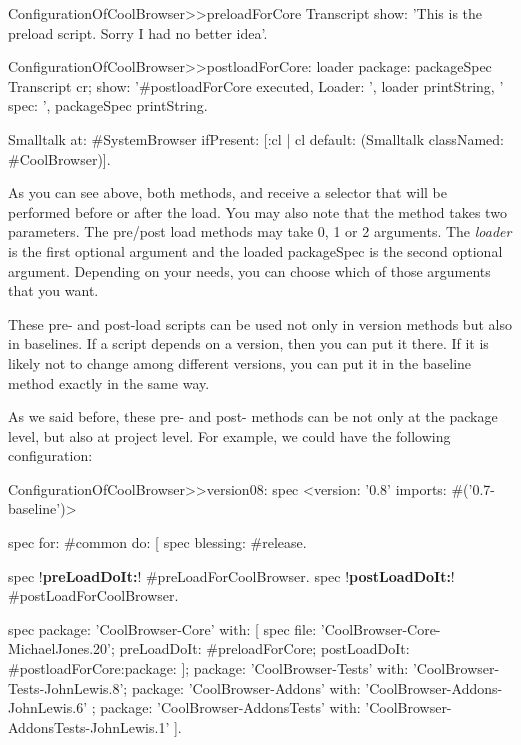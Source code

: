 \documentclass[a4paper,10pt,twoside]{book}
\begin{document}
\begin{code}{}
ConfigurationOfCoolBrowser>>preloadForCore
  	Transcript show: 'This is the preload script. Sorry I had no better idea'. 
\end{code}

\begin{code}{}
ConfigurationOfCoolBrowser>>postloadForCore: loader package: packageSpec
	Transcript cr; 
		show: '#postloadForCore executed, Loader: ', loader printString, 
			' spec: ', packageSpec printString.
	
	Smalltalk at: #SystemBrowser ifPresent: [:cl | cl default: (Smalltalk classNamed: #CoolBrowser)].
\end{code}

As you can see above, both methods,  and  receive a selector that will be performed before or after the load. You may also note that the method   takes two parameters. The pre/post load methods may take 0, 1 or 2 arguments. The {\em loader}  is the first optional argument and the loaded packageSpec is the second optional argument. Depending on your needs, you can choose which of those arguments that you want.

These pre- and post-load scripts can be used not only in version methods but also in baselines. If a script depends on a version, then you can put it there. If it is likely not to change among different versions, you can put it in the baseline method exactly in the same way.

As we said before, these pre- and post- methods can be not only at the package level, but also at project level. For example, we could have the following configuration:

\begin{code}{} 
ConfigurationOfCoolBrowser>>version08: spec 
	<version: '0.8' imports: #('0.7-baseline')>
	
	spec for: #common do: [
		spec blessing: #release.
		
		spec !\textbf{preLoadDoIt:}! #preLoadForCoolBrowser.
		spec !\textbf{postLoadDoIt:}! #postLoadForCoolBrowser.
	
		spec 
			package: 'CoolBrowser-Core' with: [
				spec 
					file: 'CoolBrowser-Core-MichaelJones.20';
					preLoadDoIt: #preloadForCore;
					postLoadDoIt: #postloadForCore:package: ];
			package: 'CoolBrowser-Tests' with: 'CoolBrowser-Tests-JohnLewis.8';
			package: 'CoolBrowser-Addons' with: 'CoolBrowser-Addons-JohnLewis.6' ;
			package: 'CoolBrowser-AddonsTests' with: 'CoolBrowser-AddonsTests-JohnLewis.1' ].
\end{code}
\end{document}
